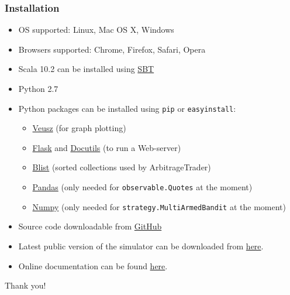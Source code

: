 \documentclass{beamer}
\begin{document}
\begin{frame}
\frametitle{Installation}
\begin{itemize}
\item OS supported: Linux, Mac OS X, Windows
\item Browsers supported: Chrome, Firefox, Safari, Opera
\item Scala 10.2 can be installed using \textcolor[rgb]{0.00,0.50,0.75}{\href{http://www.scala-sbt.org/release/docs/Getting-Started/Setup.html}{SBT}}
\item Python 2.7
\item Python packages can be installed using \texttt{pip} or \texttt{easyinstall}:
\begin{itemize}
\item \textcolor[rgb]{0.00,0.50,0.75}{\href{http://home.gna.org/veusz/}{Veusz}} (for graph plotting)
\item \textcolor[rgb]{0.00,0.50,0.75}{\href{http://flask.pocoo.org}{Flask}} and \textcolor[rgb]{0.00,0.50,0.75}{\href{https://pypi.python.org/pypi/docutils}{Docutils}} (to run a Web-server)
\item \textcolor[rgb]{0.00,0.50,0.75}{\href{https://pypi.python.org/pypi/blist/}{Blist}} (sorted collections used by ArbitrageTrader)
\item \textcolor[rgb]{0.00,0.50,0.75}{\href{http://pandas.pydata.org/}{Pandas}} (only needed for \texttt{observable.Quotes} at the moment)
\item \textcolor[rgb]{0.00,0.50,0.75}{\href{https://pypi.python.org/pypi/numpy}{Numpy}} (only needed for \texttt{strategy.MultiArmedBandit} at the moment)
\end{itemize}
\item Source code downloadable from \textcolor[rgb]{0.00,0.50,0.75}{\href{https://github.com/fiquant/marketsimulator}{GitHub}}
\item Latest public version of the simulator can be downloaded from \textcolor[rgb]{0.00,0.50,0.75}{\href{https://github.com/fiquant/marketsimulator/releases}{here}}.
\item Online documentation can be found \textcolor[rgb]{0.00,0.50,0.75}{\href{https://github.com/fiquant/marketsimulator/blob/master/README.rst}{here}}.
\end{itemize}

\end{frame}

\begin{frame}
\Huge{\centerline{Thank you!}}
\end{frame}

\end{document}
